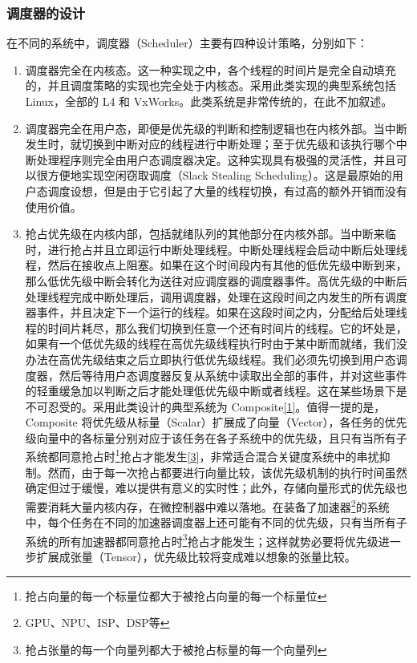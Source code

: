 \subsubsection{调度器的设计}\label{subsubsec:4-scheduler-design}

在不同的系统中，调度器（Scheduler）主要有四种设计策略，分别如下：

\begin{enumerate}
\def\labelenumi{\arabic{enumi}.}
\item
  调度器完全在内核态。这一种实现之中，各个线程的时间片是完全自动填充的，并且调度策略的实现也完全处于内核态。采用此类实现的典型系统包括 Linux，全部的 L4 和 VxWorks。此类系统是非常传统的，在此不加叙述。
\item
  调度器完全在用户态，即便是优先级的判断和控制逻辑也在内核外部。当中断发生时，就切换到中断对应的线程进行中断处理；至于优先级和该执行哪个中断处理程序则完全由用户态调度器决定。这种实现具有极强的灵活性，并且可以很方便地实现空闲窃取调度（Slack
  Stealing
  Scheduling）。这是最原始的用户态调度设想，但是由于它引起了大量的线程切换，有过高的额外开销而没有使用价值。
\item
  抢占优先级在内核内部，包括就绪队列的其他部分在内核外部。当中断来临时，进行抢占并且立即运行中断处理线程。中断处理线程会启动中断后处理线程，然后在接收点上阻塞。如果在这个时间段内有其他的低优先级中断到来，那么低优先级中断会转化为送往对应调度器的调度器事件。高优先级的中断后处理线程完成中断处理后，调用调度器，处理在这段时间之内发生的所有调度器事件，并且决定下一个运行的线程。如果在这段时间之内，分配给后处理线程的时间片耗尽，那么我们切换到任意一个还有时间片的线程。它的坏处是，如果有一个低优先级的线程在高优先级线程执行时由于某中断而就绪，我们没办法在高优先级结束之后立即执行低优先级线程。我们必须先切换到用户态调度器，然后等待用户态调度器反复从系统中读取出全部的事件，并对这些事件的轻重缓急加以判断之后才能处理低优先级中断或者线程。这在某些场景下是不可忍受的。采用此类设计的典型系统为 Composite\hyperref[cite:4-1]{{[}1{]}}。值得一提的是，Composite 将优先级从标量（Scalar）扩展成了向量（Vector），各任务的优先级向量中的各标量分别对应于该任务在各子系统中的优先级，且只有当所有子系统都同意抢占时\footnote{抢占向量的每一个标量位都大于被抢占向量的每一个标量位}抢占才能发生\hyperref[cite:4-3]{{[}3{]}}，非常适合混合关键度系统中的串扰抑制。然而，由于每一次抢占都要进行向量比较，该优先级机制的执行时间虽然确定但过于缓慢，难以提供有意义的实时性；此外，存储向量形式的优先级也需要消耗大量内核内存，在微控制器中难以落地。在装备了加速器\footnote{GPU、NPU、ISP、DSP等}的系统中，每个任务在不同的加速器调度器上还可能有不同的优先级，只有当所有子系统的所有加速器都同意抢占时\footnote{抢占张量的每一个向量列都大于被抢占标量的每一个向量列}抢占才能发生；这样就势必要将优先级进一步扩展成张量（Tensor），优先级比较将变成难以想象的张量比较。

\end{enumerate}
